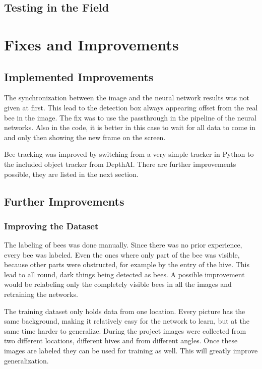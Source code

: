 \documentclass[a4paper,titlepage]{article}
\begin{document}
\subsection{Testing in the Field}

\newpage
\section{Fixes and Improvements}

\subsection{Implemented Improvements}

The synchronization between the image and the neural network results was not given at first.
This lead to the detection box always appearing offset from the real bee in the image.
The fix was to use the passthrough in the pipeline of the neural networks.
Also in the code, it is better in this case to wait for all data to come in and only then showing the new frame on the screen.

Bee tracking was improved by switching from a very simple tracker in Python to the included object tracker from DepthAI.
There are further improvements possible, they are listed in the next section.

\subsection{Further Improvements}

\subsubsection{Improving the Dataset}

The labeling of bees was done manually.
Since there was no prior experience, every bee was labeled.
Even the ones where only part of the bee was visible, because other parts were obstructed, for example by the entry of the hive.
This lead to all round, dark things being detected as bees.
A possible improvement would be relabeling only the completely visible bees in all the images and retraining the networks.

The training dataset only holds data from one location.
Every picture has the same background, making it relatively easy for the network to learn, but at the same time harder to generalize.
During the project images were collected from two different locations, different hives and from different angles.
Once these images are labeled they can be used for training as well.
This will greatly improve generalization.
\end{document}
